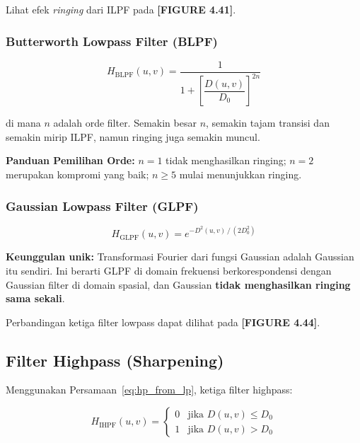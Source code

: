 \documentclass[12pt,a4paper]{article}
\begin{document}
\begin{notebox}
Lihat efek \textit{ringing} dari ILPF pada \textbf{[FIGURE 4.41]}.
\end{notebox}

\subsubsection{Butterworth Lowpass Filter (BLPF)}

\begin{equation}
  H_{\mathrm{BLPF}}(u,v) = \frac{1}{1 + \left[\dfrac{D(u,v)}{D_0}\right]^{2n}}
  \label{eq:blpf}
\end{equation}

di mana $n$ adalah orde filter. Semakin besar $n$, semakin tajam transisi
dan semakin mirip ILPF, namun ringing juga semakin muncul.

\begin{tipbox}
\textbf{Panduan Pemilihan Orde:} $n = 1$ tidak menghasilkan ringing;
$n = 2$ merupakan kompromi yang baik; $n \geq 5$ mulai menunjukkan ringing.
\end{tipbox}

\subsubsection{Gaussian Lowpass Filter (GLPF)}

\begin{equation}
  H_{\mathrm{GLPF}}(u,v) = e^{-D^2(u,v)\,/\,(2D_0^2)}
  \label{eq:glpf}
\end{equation}

\textbf{Keunggulan unik:} Transformasi Fourier dari fungsi Gaussian adalah
Gaussian itu sendiri. Ini berarti GLPF di domain frekuensi berkorespondensi
dengan Gaussian filter di domain spasial, dan Gaussian \textbf{tidak menghasilkan
ringing sama sekali}.

\begin{notebox}
Perbandingan ketiga filter lowpass dapat dilihat pada \textbf{[FIGURE 4.44]}.
\end{notebox}

\subsection{Filter Highpass (Sharpening)}

Menggunakan Persamaan~\eqref{eq:hp_from_lp}, ketiga filter highpass:

\begin{equation}
  H_{\mathrm{IHPF}}(u,v) =
  \begin{cases}
    0 & \text{jika } D(u,v) \leq D_0 \\
    1 & \text{jika } D(u,v) > D_0
  \end{cases}
  \label{eq:ihpf}
\end{equation}
\end{document}
